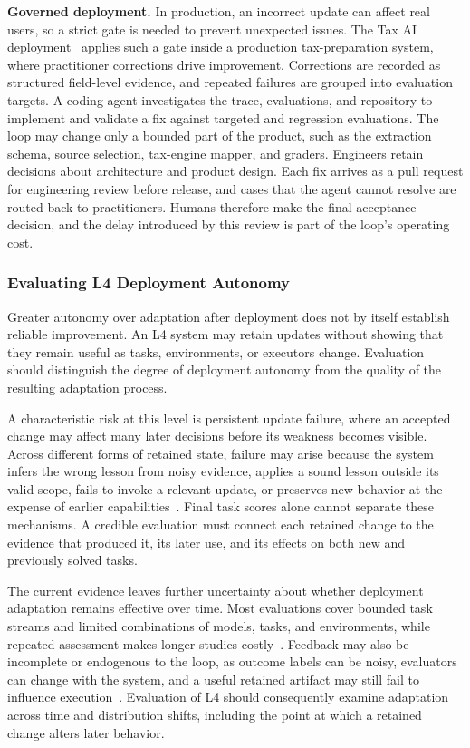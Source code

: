 \noindent\textbf{Governed deployment.} In production, an incorrect update can affect real users, so a strict gate is needed to prevent unexpected issues. The Tax AI deployment~\cite{taxai} applies such a gate inside a production tax-preparation system, where practitioner corrections drive improvement. Corrections are recorded as structured field-level evidence, and repeated failures are grouped into evaluation targets. A coding agent investigates the trace, evaluations, and repository to implement and validate a fix against targeted and regression evaluations. The loop may change only a bounded part of the product, such as the extraction schema, source selection, tax-engine mapper, and graders. Engineers retain decisions about architecture and product design. Each fix arrives as a pull request for engineering review before release, and cases that the agent cannot resolve are routed back to practitioners. Humans therefore make the final acceptance decision, and the delay introduced by this review is part of the loop's operating cost.


\subsubsection{Evaluating L4 Deployment Autonomy}

Greater autonomy over adaptation after deployment does not by itself establish reliable improvement. An L4 system may retain updates without showing that they remain useful as tasks, environments, or executors change. Evaluation should distinguish the degree of deployment autonomy from the quality of the resulting adaptation process.

A characteristic risk at this level is persistent update failure, where an accepted change may affect many later decisions before its weakness becomes visible. Across different forms of retained state, failure may arise because the system infers the wrong lesson from noisy evidence, applies a sound lesson outside its valid scope, fails to invoke a relevant update, or preserves new behavior at the expense of earlier capabilities~\cite{suzgun2026dynamic,zhang2026library,liu2026rethinking,lin2026harness}. Final task scores alone cannot separate these mechanisms. A credible evaluation must connect each retained change to the evidence that produced it, its later use, and its effects on both new and previously solved tasks.

The current evidence leaves further uncertainty about whether deployment adaptation remains effective over time. Most evaluations cover bounded task streams and limited combinations of models, tasks, and environments, while repeated assessment makes longer studies costly~\cite{ni2026trace2skill,xiao2026pilot,wu2026harnessdev}. Feedback may also be incomplete or endogenous to the loop, as outcome labels can be noisy, evaluators can change with the system, and a useful retained artifact may still fail to influence execution~\cite{ouyang2026reasoningbank,chen2026decoevo,lin2026harness}. Evaluation of L4 should consequently examine adaptation across time and distribution shifts, including the point at which a retained change alters later behavior.

